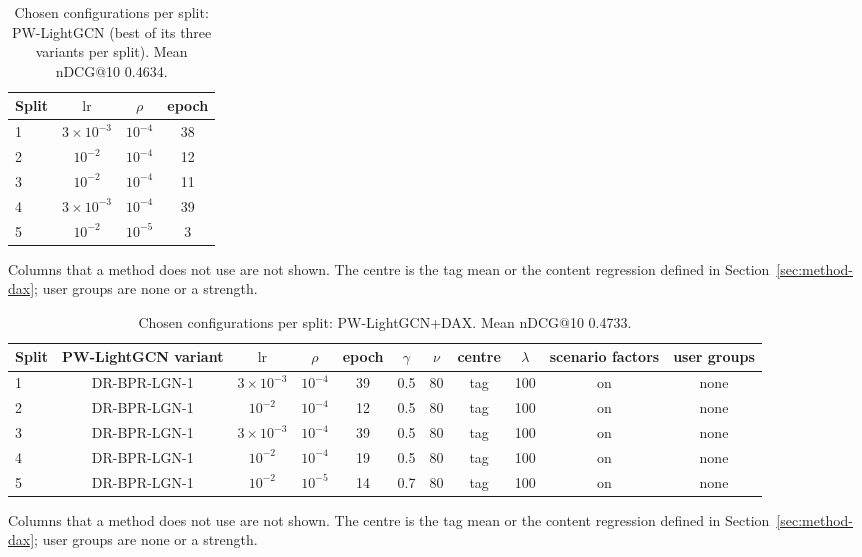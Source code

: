 \documentclass[preprint,12pt,authoryear]{elsarticle}
\begin{document}
\begin{table}[tbp]
\centering
\footnotesize
\caption{Chosen configurations per split: PW-LightGCN (best of its three variants per split). Mean nDCG@10 0.4634.}
\label{tab:grid02}
\begin{adjustbox}{max width=\linewidth}
\begin{tabular}{lccc}
\toprule
Split & $\mathrm{lr}$ & $\rho$ & epoch \\
\midrule
1 & $3\times10^{-3}$ & $10^{-4}$ & 38 \\
2 & $10^{-2}$ & $10^{-4}$ & 12 \\
3 & $10^{-2}$ & $10^{-4}$ & 11 \\
4 & $3\times10^{-3}$ & $10^{-4}$ & 39 \\
5 & $10^{-2}$ & $10^{-5}$ & 3 \\
\bottomrule
\end{tabular}
\end{adjustbox}
\par\smallskip
\begin{minipage}{\linewidth}\raggedright\footnotesize Columns that a method does not use are not shown. The centre is the tag mean or the content regression defined in Section~\ref{sec:method-dax}; user groups are none or a strength.\end{minipage}
\end{table}

\begin{table}[tbp]
\centering
\footnotesize
\caption{Chosen configurations per split: PW-LightGCN+DAX. Mean nDCG@10 0.4733.}
\label{tab:grid03}
\begin{adjustbox}{max width=\linewidth}
\begin{tabular}{lcccccccccc}
\toprule
Split & PW-LightGCN variant & $\mathrm{lr}$ & $\rho$ & epoch & $\gamma$ & $\nu$ & centre & $\lambda$ & scenario factors & user groups \\
\midrule
1 & DR-BPR-LGN-1 & $3\times10^{-3}$ & $10^{-4}$ & 39 & 0.5 & 80 & tag & 100 & on & none \\
2 & DR-BPR-LGN-1 & $10^{-2}$ & $10^{-4}$ & 12 & 0.5 & 80 & tag & 100 & on & none \\
3 & DR-BPR-LGN-1 & $3\times10^{-3}$ & $10^{-4}$ & 39 & 0.5 & 80 & tag & 100 & on & none \\
4 & DR-BPR-LGN-1 & $10^{-2}$ & $10^{-4}$ & 19 & 0.5 & 80 & tag & 100 & on & none \\
5 & DR-BPR-LGN-1 & $10^{-2}$ & $10^{-5}$ & 14 & 0.7 & 80 & tag & 100 & on & none \\
\bottomrule
\end{tabular}
\end{adjustbox}
\par\smallskip
\begin{minipage}{\linewidth}\raggedright\footnotesize Columns that a method does not use are not shown. The centre is the tag mean or the content regression defined in Section~\ref{sec:method-dax}; user groups are none or a strength.\end{minipage}
\end{table}
\end{document}
